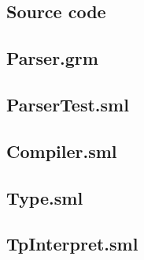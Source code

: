 \documentclass{article}
\begin{document}
\newpage
\begin{appendix}
\section{Source code}
\subsection{Parser.grm}
    
\subsection{ParserTest.sml}
    
\subsection{Compiler.sml}
    
\subsection{Type.sml}
    
\subsection{TpInterpret.sml}
    
\end{appendix}
\end{document}
